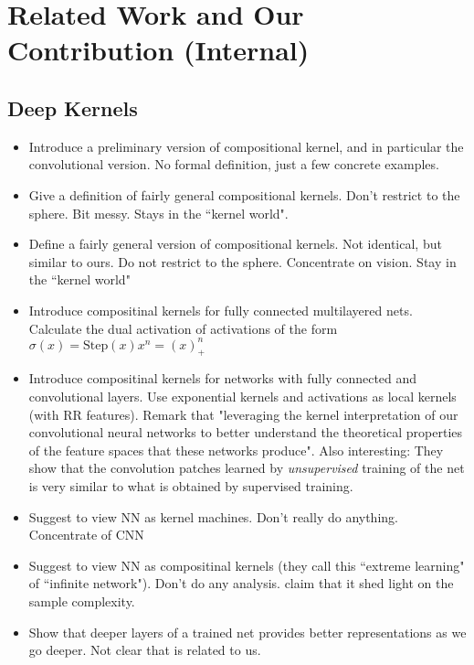 \section{Related Work and Our Contribution (Internal)}
\subsection*{Deep Kernels}
\begin{itemize}
\item \cite{scholkopf1998prior, grauman2005pyramid} Introduce a preliminary version of compositional kernel, and in particular the convolutional version. No formal definition, just a few concrete examples.
\item \cite{strobl2013deep} Give a definition of fairly general compositional kernels. Don't restrict to the sphere. Bit messy. Stays in the ``kernel world".
\item \cite{bo2011object} Define a fairly general version of compositional kernels. Not identical, but similar to ours. Do not restrict to the sphere. Concentrate on vision. Stay in the ``kernel world"
\item \cite{cho2009kernel} Introduce compositinal kernels for fully connected multilayered nets. Calculate the dual activation of activations of the form $\sigma(x)=\mathrm{Step}(x)x^n=(x)^n_+$
\item \cite{mairal2014convolutional} Introduce compositinal kernels for networks with fully connected and convolutional layers. Use exponential kernels and activations as local kernels (with RR features). Remark that "leveraging the kernel interpretation of our convolutional neural networks to better understand the theoretical properties of the feature spaces that these networks produce". Also interesting: They show that the convolution patches learned by {\em unsupervised} training of the net is very similar to what is obtained by supervised training.
\item \cite{anselmi2015deep} Suggest to view NN as kernel machines. Don't really do anything. Concentrate of CNN
\item \cite{parviainen2010interpreting, parviainen2013connection, hazan2015steps} Suggest to view NN as compositinal kernels (they call this ``extreme learning" of ``infinite network"). Don't do any analysis. \cite{hazan2015steps} claim that it shed light on the sample complexity.
\item \cite{montavon2011kernel} Show that deeper layers of a trained net provides better representations as we go deeper. Not clear that is related to us.
\end{itemize}

